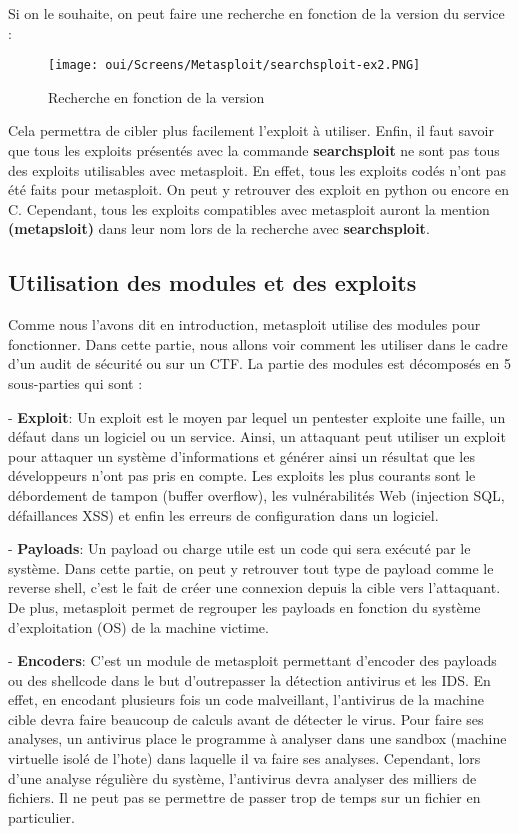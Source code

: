 \newpage
\noindent Si on le souhaite, on peut faire une recherche en fonction de la version du service :
\begin{figure}[htp!]
  \centering
  \setlength\figureheight{7cm}
  \setlength\figurewidth{9cm}
  \texttt{[image: oui/Screens/Metasploit/searchsploit-ex2.PNG]}
  \caption{Recherche en fonction de la version}
  \label{fig:courbe-tikz}
\end{figure}

    \noindent Cela permettra de cibler plus facilement l'exploit à utiliser. Enfin, il faut savoir que tous les exploits présentés avec la commande \textbf{searchsploit} ne sont pas tous des exploits utilisables avec metasploit. En effet, tous les exploits codés n'ont pas été faits pour metasploit. On peut y retrouver des exploit en python ou encore en C. Cependant, tous les exploits compatibles avec metasploit auront la mention \textbf{(metapsloit)} dans leur nom lors de la recherche avec \textbf{searchsploit}. 

\subsection{Utilisation des modules et des exploits}

Comme nous l'avons dit en introduction, metasploit utilise des modules pour fonctionner. Dans cette partie, nous allons voir comment les utiliser dans le cadre d'un audit de sécurité ou sur un CTF. La partie des modules est décomposés en 5 sous-parties qui sont :

- \textbf{Exploit}: Un exploit est le moyen par lequel un pentester exploite une faille, un défaut dans un logiciel ou un service. Ainsi, un attaquant peut utiliser un exploit pour attaquer un système d'informations et générer ainsi un résultat que les développeurs n'ont pas pris en compte. Les exploits les plus courants sont le débordement de tampon (buffer overflow), les vulnérabilités Web (injection SQL, défaillances XSS) et enfin les erreurs de configuration dans un logiciel.

- \textbf{Payloads}: Un payload ou charge utile est un code qui sera exécuté par le système. Dans cette partie, on peut y retrouver tout type de payload comme le reverse shell, c'est le fait de créer une connexion depuis la cible vers l’attaquant. De plus, metasploit permet de regrouper les payloads en fonction du système d'exploitation (OS) de la machine victime.

- \textbf{Encoders}: C'est un module de metasploit permettant d'encoder des payloads ou des shellcode dans le but d'outrepasser la détection antivirus et les IDS. En effet, en encodant plusieurs fois un code malveillant, l'antivirus de la machine cible devra faire beaucoup de calculs avant de détecter le virus. Pour faire ses analyses, un antivirus place le programme à analyser dans une sandbox (machine virtuelle isolé de l'hote) dans laquelle il va faire ses analyses. Cependant, lors d’une analyse régulière du système, l’antivirus devra analyser des milliers de fichiers. Il ne peut pas se permettre de passer trop de temps sur un fichier en particulier.

